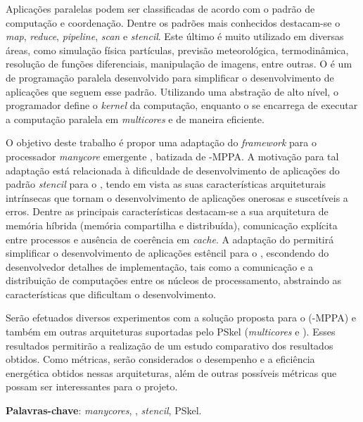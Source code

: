 
\setlength{\absparsep}{18pt} %
\begin{resumo}
Aplicações paralelas podem ser classificadas de acordo com o padrão de
computação e coordenação. Dentre os padrões mais conhecidos destacam-se o
\textit{map}, \textit{reduce}, \textit{pipeline}, \textit{scan} e
\textit{stencil}. Este último é muito utilizado em diversas áreas, como
simulação física partículas, previsão meteorológica, termodinâmica, resolução de
funções diferenciais, manipulação de imagens, entre outras. O \pskel é um \fw de
programação paralela desenvolvido para simplificar o desenvolvimento de
aplicações que seguem esse padrão. Utilizando uma abstração de alto nível, o
programador define o \emph{kernel} da computação, enquanto o \fw se encarrega de
executar a computação paralela em \textit{multicores} e \gpus de maneira eficiente.

O objetivo deste trabalho é propor uma adaptação do \textit{framework} \pskel
para o processador \textit{manycore} emergente \mppa, batizada de \pskel-MPPA. A
motivação para tal adaptação está relacionada à dificuldade de desenvolvimento
de aplicações do padrão \textit{stencil} para o \mppa, tendo em vista as suas
características arquiteturais intrínsecas que tornam o desenvolvimento de
aplicações onerosas e suscetíveis a erros. Dentre as principais características
destacam-se a sua arquitetura de memória híbrida (memória compartilha e
distribuída), comunicação explícita entre processos e ausência de coerência em
\textit{cache}. A adaptação do \fw permitirá simplificar o desenvolvimento de
aplicações estêncil para o \mppa, escondendo do desenvolvedor detalhes de
implementação, tais como a comunicação e a distribuição de computações entre os
núcleos de processamento, abstraindo as características que dificultam o
desenvolvimento.

Serão efetuados diversos experimentos com a solução proposta para o \mppa
(\pskel-MPPA) e também em outras arquiteturas suportadas pelo PSkel
(\textit{multicores} e \gpus). Esses resultados permitirão a realização de um
estudo comparativo dos resultados obtidos. Como métricas, serão considerados o
desempenho e a eficiência energética obtidos nessas arquiteturas, além de outras
possíveis métricas que possam ser interessantes para o projeto.

 \textbf{Palavras-chave}: \textit{manycores}, \mppa, \textit{stencil}, PSkel.
\end{resumo}

